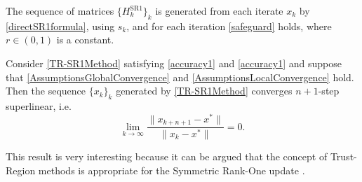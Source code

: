 \begin{assumption}\label{AssumptionsLocalConvergence}
    The sequence of matrices $\{ H^{\mathrm{SR1}}_k \}_k$ is generated from each iterate $x_k$ by \cref{directSR1formula}, using $s_k$, and for each iteration \cref{safeguard} holds, where $r \in (0, 1)$ is a constant.
\end{assumption}
\begin{theorem} \label{LocalConvergence}
    Consider \cref{TR-SR1Method} satisfying \cref{accuracy1} and \cref{accuracy1} and suppose that \cref{AssumptionsGlobalConvergence} and \cref{AssumptionsLocalConvergence} hold. Then the sequence $\{ x_k \}_k$ generated by \cref{TR-SR1Method} converges $n+1$-step superlinear, i.e. 
    \begin{equation}\label{n+1superlinear}
        \lim_{k \rightarrow \infty} \frac{\lVert x_{k+n+1} - x^* \rVert}{\lVert x_k - x^* \rVert} = 0.
    \end{equation}
\end{theorem}
This result is very interesting because it can be argued that the concept of Trust-Region methods is appropriate for the Symmetric Rank-One update \cite[p.~1025]{ByrdKhalfanSchnabel:1996}.
